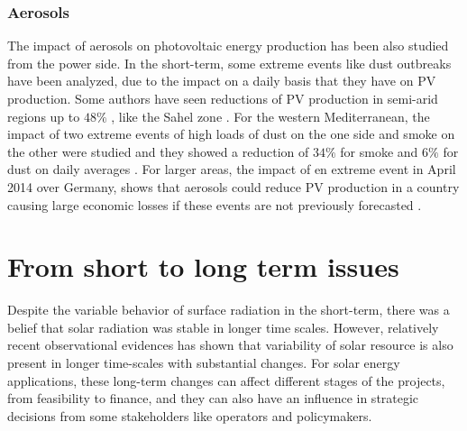 \subsubsection{Aerosols}

The impact of aerosols on photovoltaic energy production has been also studied from the power side. In the short-term, some extreme events like dust outbreaks have been analyzed, due to the impact on a daily basis that they have on PV production. Some authors have seen reductions of PV production in semi-arid regions up to $48\%$ , like the Sahel zone \cite*{Neher2017}. For the western Mediterranean, the impact of two extreme events of high loads of dust on the one side and smoke on the other were studied and they showed a reduction of $34\%$ for smoke and $6\%$ for dust on daily averages \cite*{Gomez-Amo2019}. For larger areas, the impact of en extreme event in April 2014 over Germany, shows that aerosols could reduce PV production in a country causing large economic losses if these events are not previously forecasted \cite*{Rieger2017}.


\section{From short to long term issues}%

Despite the variable behavior of surface radiation in the short-term, there was a belief that solar radiation was stable in longer time scales. However, relatively recent observational evidences has shown that variability of solar resource is also present in longer time-scales with substantial changes. For solar energy applications, these long-term changes can affect different stages of the projects, from feasibility to finance, and they can also have an influence in strategic decisions from some stakeholders like operators and policymakers.

